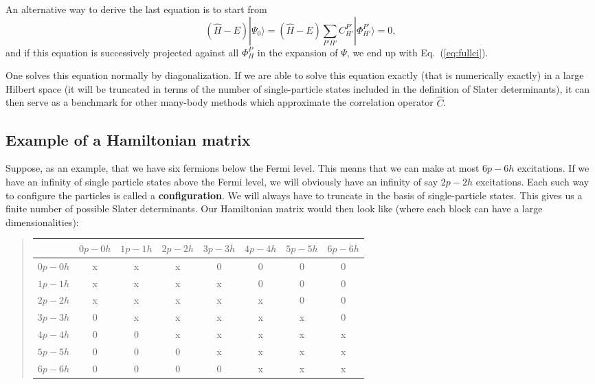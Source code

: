 An alternative way to derive the last equation is to start from 
\[
(\hat{H} -E)|\Psi_0\rangle = (\hat{H} -E)\sum_{P'H'}C_{H'}^{P'}|\Phi_{H'}^{P'} \rangle=0, 
\]
and if this equation is successively projected against all $\Phi_H^P$ in the expansion of $\Psi$, we end up with Eq.~(\ref{eq:fullci}).

One solves this equation normally by diagonalization. If we are able to solve this equation exactly (that is
numerically exactly) in a large Hilbert space (it will be truncated in terms of the number of single-particle states included in the definition
of Slater determinants), it can then serve as a benchmark for other many-body methods which approximate the correlation operator
$\hat{C}$.  


\subsection{Example of a Hamiltonian matrix}

Suppose, as an example, that we have six fermions below the Fermi level.
This means that we can make at most $6p-6h$ excitations. If we have an infinity of single particle states above the Fermi level, we will obviously have an infinity of say $2p-2h$ excitations. Each such way to configure the particles is called a \textbf{configuration}. We will always have to truncate in the basis of single-particle states.
This gives us a finite number of possible Slater determinants. Our Hamiltonian matrix would then look like (where each block can have a large dimensionalities):


\begin{quote}
\begin{tabular}{cccccccc}
\hline
\multicolumn{1}{c}{  } & \multicolumn{1}{c}{ $0p-0h$ } & \multicolumn{1}{c}{ $1p-1h$ } & \multicolumn{1}{c}{ $2p-2h$ } & \multicolumn{1}{c}{ $3p-3h$ } & \multicolumn{1}{c}{ $4p-4h$ } & \multicolumn{1}{c}{ $5p-5h$ } & \multicolumn{1}{c}{ $6p-6h$ } \\
\hline
$0p-0h$ & x       & x       & x       & 0       & 0       & 0       & 0       \\
$1p-1h$ & x       & x       & x       & x       & 0       & 0       & 0       \\
$2p-2h$ & x       & x       & x       & x       & x       & 0       & 0       \\
$3p-3h$ & 0       & x       & x       & x       & x       & x       & 0       \\
$4p-4h$ & 0       & 0       & x       & x       & x       & x       & x       \\
$5p-5h$ & 0       & 0       & 0       & x       & x       & x       & x       \\
$6p-6h$ & 0       & 0       & 0       & 0       & x       & x       & x       \\
\hline
\end{tabular}
\end{quote}

